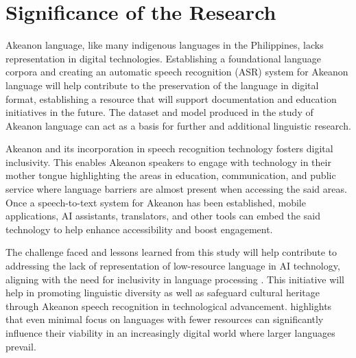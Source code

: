 \section{Significance of the Research}
\label{sec:significance}

Akeanon language, like many indigenous languages in the Philippines, lacks representation in digital technologies. Establishing a foundational language corpora and creating an automatic speech recognition (ASR) system for Akeanon language will help contribute to the preservation of the language in digital format, establishing a resource that will support documentation and education initiatives in the future. The dataset and model produced in the study of Akeanon language can act as a basis for further and additional linguistic research.

Akeanon and its incorporation in speech recognition technology fosters digital inclusivity. This enables Akeanon speakers to engage with technology in their mother tongue highlighting the areas in education, communication, and public service where language barriers are almost present when accessing the said areas. Once a speech-to-text system for Akeanon has been established, mobile applications, AI assistants, translators, and other tools can embed the said technology to help enhance accessibility and boost engagement.

The challenge faced and lessons learned from this study will help contribute to addressing the lack of representation of low-resource language in AI technology, aligning with the need for inclusivity in language processing \cite{Poupard:2024}. This initiative will help in promoting linguistic diversity as well as safeguard cultural heritage through Akeanon speech recognition in technological advancement.  highlights that even minimal focus on languages with fewer resources can significantly influence their viability in an increasingly digital world where larger languages prevail.



